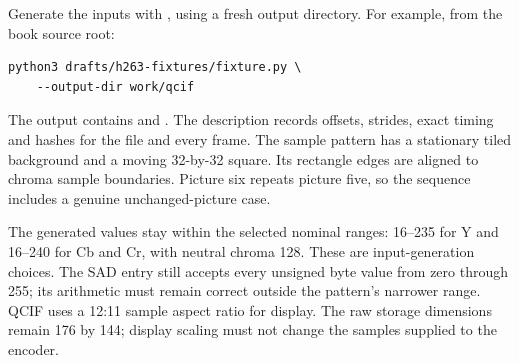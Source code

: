 Generate the inputs with
, using a fresh output directory. For example, from the book source root:
\begin{verbatim}
python3 drafts/h263-fixtures/fixture.py \
    --output-dir work/qcif
\end{verbatim}
The output
contains  and . The description records offsets,
strides, exact timing and hashes for the file and every frame. The sample pattern
has a stationary tiled background and a moving 32-by-32 square. Its rectangle
edges are aligned to chroma sample boundaries. Picture six repeats picture five,
so the sequence includes a genuine unchanged-picture case.

The generated values stay within the selected nominal ranges: 16--235 for Y and
16--240 for Cb and Cr, with neutral chroma 128. These are input-generation choices.
The SAD entry still accepts every unsigned byte value from zero through 255; its
arithmetic must remain correct outside the pattern's narrower range. QCIF uses a
12:11 sample aspect ratio for display. The raw storage dimensions remain 176 by
144; display scaling must not change the samples supplied to the encoder.
